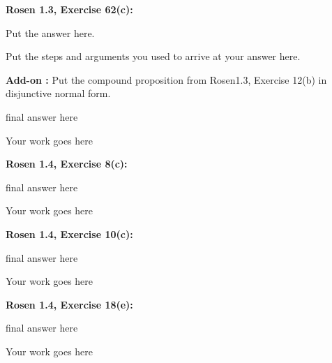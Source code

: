 \documentclass[10pt]{article}
\begin{document}
\noindent
{\bf Rosen 1.3, Exercise 62(c):}  \\

\begin{framed}
Put the answer here.
\end{framed}


\vspace*{1cm}
\noindent
Put the steps and arguments you used to arrive at your answer here.



\newpage


\noindent
{\bf Add-on :}  Put the compound proposition from Rosen1.3, Exercise 12(b) in disjunctive normal form.\\

\begin{framed}
final answer here
\end{framed}

\vspace*{1cm}
\noindent
Your work goes here


\newpage


\noindent
{\bf Rosen 1.4, Exercise 8(c):}  \\

\begin{framed}
final answer here
\end{framed}

\vspace*{1cm}
\noindent
Your work goes here


\newpage



\noindent
{\bf Rosen 1.4, Exercise 10(c):}  \\

\begin{framed}
final answer here
\end{framed}

\vspace*{1cm}
\noindent
Your work goes here


\newpage



\noindent
{\bf Rosen 1.4, Exercise 18(e):}  \\

\begin{framed}
final answer here
\end{framed}

\vspace*{1cm}
\noindent
Your work goes here


\newpage
\end{document}
